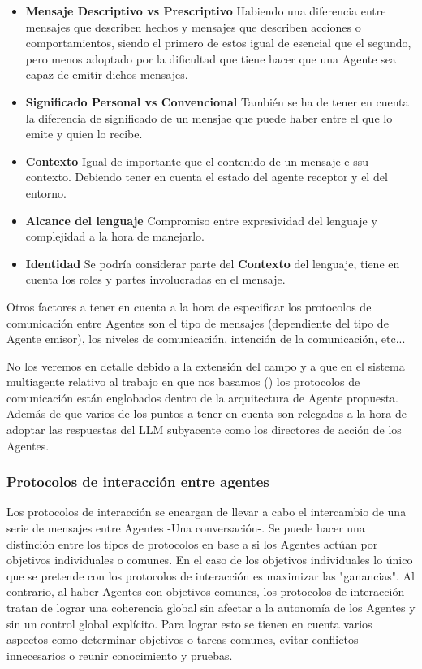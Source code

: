\begin{itemize}
	\item\textbf{Mensaje Descriptivo vs Prescriptivo} Habiendo una diferencia entre mensajes que describen hechos y mensajes que describen acciones o comportamientos, siendo el primero de estos igual de esencial que el segundo, pero menos adoptado por la dificultad que tiene hacer que una Agente sea capaz de emitir dichos mensajes.
	\item\textbf{Significado Personal vs Convencional} También se ha de tener en cuenta la diferencia de significado de un mensjae que puede haber entre el que lo emite y quien lo recibe.
	\item\textbf{Contexto} Igual de importante que el contenido de un mensaje e ssu contexto. Debiendo tener en cuenta el estado del agente receptor y el del entorno.
	\item\textbf{Alcance del lenguaje} Compromiso entre expresividad del lenguaje y complejidad a la hora de manejarlo.
	\item\textbf{Identidad} Se podría considerar parte del \textbf{Contexto} del lenguaje, tiene en cuenta los roles y partes involucradas en el mensaje.
\end{itemize}

Otros factores a tener en cuenta a la hora de especificar los protocolos de comunicación entre Agentes son el tipo de mensajes (dependiente del tipo de Agente emisor), los niveles de comunicación, intención de la comunicación, etc... 

No los veremos en detalle debido a la extensión del campo y a que en el sistema multiagente relativo al trabajo en que nos basamos (\cite{park2023generative}) los protocolos de comunicación están englobados dentro de la arquitectura de Agente propuesta. Además de que varios de los puntos a tener en cuenta son relegados a la hora de adoptar las respuestas del LLM subyacente como los directores de acción de los Agentes.

\subsubsection{Protocolos de interacción entre agentes}

Los protocolos de interacción se encargan de llevar a cabo el intercambio de una serie de mensajes entre Agentes -Una conversación-. Se puede hacer una distinción entre los tipos de protocolos en base a si los Agentes actúan por objetivos individuales o comunes. En el caso de los objetivos individuales lo único que se pretende con los protocolos de interacción es maximizar las "ganancias". Al contrario, al haber Agentes con objetivos comunes, los protocolos de interacción tratan de lograr una coherencia global sin afectar a la autonomía de los Agentes y sin un control global explícito. Para lograr esto se tienen en cuenta varios aspectos como determinar objetivos o tareas comunes, evitar conflictos innecesarios o reunir conocimiento y pruebas.

